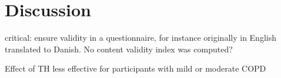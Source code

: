 \section{Discussion}

critical: ensure validity in a questionnaire, for instance originally in English translated to Danish. No content validity index was computed? 




Effect of TH less effective for participants with mild or moderate COPD